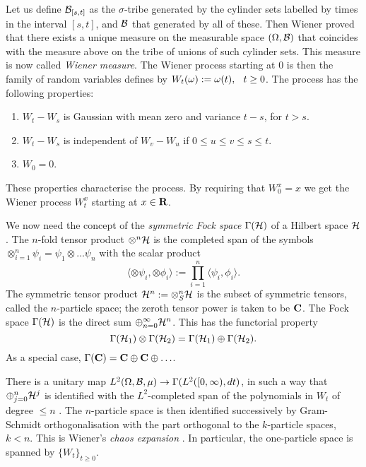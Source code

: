Let us define ${\cal B}_{[s,t]}$ as the $\sigma$-tribe generated by the
cylinder sets labelled by times in the interval $[s,t]$, and ${\cal B}$
that generated by all of these. Then Wiener proved that there exists
a unique measure on the measurable space $(\Omega,{\cal B})$ that coincides
with the measure above on the tribe of unions of such cylinder sets.
This measure is now called {\em Wiener measure}.
The Wiener process starting at $0$ is then the family of random variables
defines by $W_t(\omega):=\omega(t),\hspace{.1in}t\geq0$.
The process has the following properties:
\begin{enumerate}
\item $W_t-W_s$ is Gaussian with mean zero and variance $t-s$, for $t>s$.
\item $W_t-W_s$ is independent of $W_v-W_u$ if $0\leq u\leq v\leq s\leq t$.
\item $W_0=0$.
\end{enumerate}
These properties characterise the process.
By requiring that $W^x_0=x$ we get the Wiener process $W_t^x$ 
starting at $x\in{\bf R}$.


We now need the concept of the {\em symmetric Fock space} $\Gamma({\cal H})$
of a Hilbert space ${\cal H}$. The $n$-fold tensor product $\otimes^n{\cal
 H}$ is the completed span of the symbols $\otimes_{i=1}^n\psi_i=\psi_1
\otimes\ldots\psi_n$ with the scalar product
\[ \langle\otimes\psi_i,\otimes\phi_i\rangle:=\prod_{i=1}^n
\langle\psi_i,\phi_i\rangle.\]
The symmetric tensor product ${\cal H}^n:=\otimes_S^n{\cal H}$
is the subset of symmetric
tensors, called the $n$-particle space; the zeroth tensor power is taken to
be ${\bf C}$. The Fock space
$\Gamma({\cal H})$ is the direct sum $\oplus_{n=0}^\infty{\cal H}^n$.
This has the functorial property
\[ \Gamma({\cal H}_1)\otimes\Gamma({\cal H}_2)=\Gamma({\cal H}_1)
\oplus\Gamma({\cal H}_2).\]
As a special case, $\Gamma({\bf C})={\bf C}\oplus{\bf C}\oplus\ldots$.

There is a unitary map $L^2(\Omega,{\cal B},\mu)\rightarrow\Gamma
(L^2([0,\infty),dt)$, in such a way that $\oplus_{j=0}^n{\cal H}^j$
is identified with the $L^2$-completed span of the polynomials in $W_t$
of degree $\leq n$ \cite{Segal}. The $n$-particle space is then identified successively
by Gram-Schmidt orthogonalisation with the part orthogonal to the
$k$-particle spaces, $k<n$. This is Wiener's {\em chaos expansion}
\cite{Wiener2}.
In particular, the one-particle space is spanned by $\{W_t\}_{t\geq0}$.

